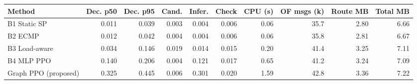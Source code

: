 \begin{tabular}{lrrrrrrrrr}
\toprule
Method & Dec. p50 & Dec. p95 & Cand. & Infer. & Check & CPU (s) & OF msgs (k) & Route MB & Total MB \\
\midrule
B1 Static SP & 0.011 & 0.039 & 0.003 & 0.004 & 0.006 & 0.06 & 35.7 & 2.80 & 6.66 \\
B2 ECMP & 0.012 & 0.042 & 0.004 & 0.004 & 0.006 & 0.06 & 35.8 & 2.81 & 6.67 \\
B3 Load-aware & 0.034 & 0.146 & 0.019 & 0.014 & 0.015 & 0.20 & 41.4 & 3.25 & 7.11 \\
B4 MLP PPO & 0.140 & 0.206 & 0.004 & 0.121 & 0.017 & 0.65 & 41.2 & 3.24 & 7.09 \\
Graph PPO (proposed) & 0.325 & 0.445 & 0.006 & 0.301 & 0.020 & 1.59 & 42.8 & 3.36 & 7.22 \\
\bottomrule
\end{tabular}